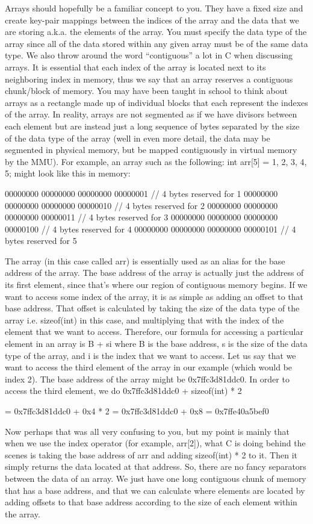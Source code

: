 \documentclass{article}
\begin{document}
Arrays should hopefully be a familiar concept to you. They have a fixed size and create key-pair mappings
between the indices of the array and the data that we are storing a.k.a. the elements of the array. You must
specify the data type of the array since all of the data stored within any given array must be of the same
data type. We also throw around the word “contiguous” a lot in C when discussing arrays. It is essential that
each index of the array is located next to its neighboring index in memory, thus we say that an array
reserves a contiguous chunk/block of memory. You may have been taught in school to think about arrays as a
rectangle made up of individual blocks that each represent the indexes of the array. In reality, arrays are
not segmented as if we have divisors between each element but are instead just a long sequence of bytes
separated by the size of the data type of the array (well in even more detail, the data may be segmented in
physical memory, but be mapped contiguously in virtual memory by the MMU). For example, an array such as the
following: int arr[5] = {1, 2, 3, 4, 5}; might look like this in memory:

00000000 00000000 00000000 00000001 // 4 bytes reserved for 1
00000000 00000000 00000000 00000010 // 4 bytes reserved for 2
00000000 00000000 00000000 00000011 // 4 bytes reserved for 3
00000000 00000000 00000000 00000100 // 4 bytes reserved for 4
00000000 00000000 00000000 00000101 // 4 bytes reserved for 5

The array (in this case called arr) is essentially used as an alias for the base address of the array. The
base address of the array is actually just the address of its first element, since that’s where our region of
contiguous memory begins. If we want to access some index of the array, it is as simple as adding an offset
to that base address. That offset is calculated by taking the size of the data type of the array i.e.
sizeof(int) in this case, and multiplying that with the index of the element that we want to access.
Therefore, our formula for accessing a particular element in an array is B + si where B is the base address,
s is the size of the data type of the array, and i is the index that we want to access. Let us say that we
want to access the third element of the array in our example (which would be index 2). The base address of
the array might be 0x7ffc3d81ddc0. In order to access the third element, we do 0x7ffc3d81ddc0 + sizeof(int)
* 2

= 0x7ffc3d81ddc0 + 0x4 * 2
= 0x7ffc3d81ddc0 + 0x8
= 0x7ffe40a5bef0

Now perhaps that was all very confusing to you, but my point is mainly that when we use the index operator
(for example, arr[2]), what C is doing behind the scenes is taking the base address of arr and adding
sizeof(int) * 2 to it. Then it simply returns the data located at that address. So, there are no fancy
separators between the data of an array. We just have one long contiguous chunk of memory that has a base
address, and that we can calculate where elements are located by adding offsets to that base address according
to the size of each element within the array.
\end{document}
